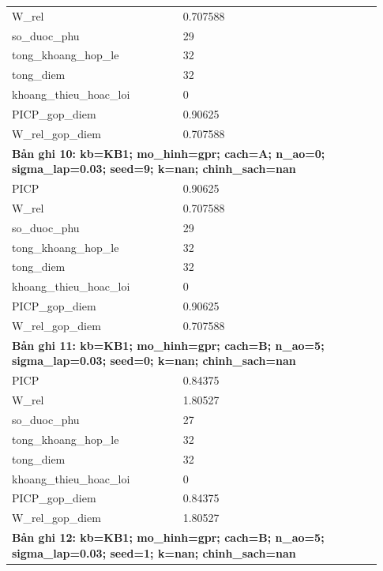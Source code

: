 \begin{longtable}{p{0.43\linewidth}p{0.50\linewidth}}
W\_\allowbreak rel & 0.707588 \\
so\_\allowbreak duoc\_\allowbreak phu & 29 \\
tong\_\allowbreak khoang\_\allowbreak hop\_\allowbreak le & 32 \\
tong\_\allowbreak diem & 32 \\
khoang\_\allowbreak thieu\_\allowbreak hoac\_\allowbreak loi & 0 \\
PICP\_\allowbreak gop\_\allowbreak diem & 0.90625 \\
W\_\allowbreak rel\_\allowbreak gop\_\allowbreak diem & 0.707588 \\
\midrule
\multicolumn{2}{p{0.95\linewidth}}{\textbf{Bản ghi 10: kb=KB1; mo\_hinh=gpr; cach=A; n\_ao=0; sigma\_lap=0.03; seed=9; k=nan; chinh\_sach=nan}} \\
PICP & 0.90625 \\
W\_\allowbreak rel & 0.707588 \\
so\_\allowbreak duoc\_\allowbreak phu & 29 \\
tong\_\allowbreak khoang\_\allowbreak hop\_\allowbreak le & 32 \\
tong\_\allowbreak diem & 32 \\
khoang\_\allowbreak thieu\_\allowbreak hoac\_\allowbreak loi & 0 \\
PICP\_\allowbreak gop\_\allowbreak diem & 0.90625 \\
W\_\allowbreak rel\_\allowbreak gop\_\allowbreak diem & 0.707588 \\
\midrule
\multicolumn{2}{p{0.95\linewidth}}{\textbf{Bản ghi 11: kb=KB1; mo\_hinh=gpr; cach=B; n\_ao=5; sigma\_lap=0.03; seed=0; k=nan; chinh\_sach=nan}} \\
PICP & 0.84375 \\
W\_\allowbreak rel & 1.80527 \\
so\_\allowbreak duoc\_\allowbreak phu & 27 \\
tong\_\allowbreak khoang\_\allowbreak hop\_\allowbreak le & 32 \\
tong\_\allowbreak diem & 32 \\
khoang\_\allowbreak thieu\_\allowbreak hoac\_\allowbreak loi & 0 \\
PICP\_\allowbreak gop\_\allowbreak diem & 0.84375 \\
W\_\allowbreak rel\_\allowbreak gop\_\allowbreak diem & 1.80527 \\
\midrule
\multicolumn{2}{p{0.95\linewidth}}{\textbf{Bản ghi 12: kb=KB1; mo\_hinh=gpr; cach=B; n\_ao=5; sigma\_lap=0.03; seed=1; k=nan; chinh\_sach=nan}} \\

\end{longtable}

